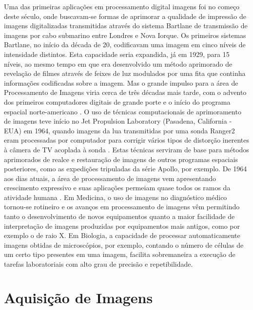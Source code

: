 \documentclass[openright]{UFRGS} %
\begin{document}
Uma das primeiras aplicações em processamento digital imagens foi no começo deste século,
onde buscavam-se formas de aprimorar a qualidade de impressão de imagens digitalizadas
transmitidas através do sistema Bartlane de transmissão de imagens por cabo submarino entre
Londres e Nova Iorque. Os primeiros sistemas Bartlane, no início da década de 20, codificavam
uma imagem em cinco níveis de intensidade distintos. Esta capacidade seria expandida, já em
1929, para 15 níveis, ao mesmo tempo em que era desenvolvido um método aprimorado de
revelação de filmes através de feixes de luz modulados por uma fita que continha informações
codificadas sobre a imagem. Mas o grande impulso para a área de Processamento de Imagens viria cerca de três
décadas mais tarde, com o advento dos primeiros computadores digitais de grande porte e o
início do programa espacial norte-americano \cite{gonzalez2010processamento}. O uso de técnicas computacionais de
aprimoramento de imagens teve início no Jet Propulsion Laboratory (Pasadena, California -
EUA) em 1964, quando imagens da lua transmitidas por uma sonda Ranger2
eram processadas por computador para corrigir vários tipos de distorção inerentes à câmera de TV acoplada à
sonda \cite{gonzalez2010processamento}. Estas técnicas serviram de base para métodos aprimorados de realce e restauração de
imagens de outros programas espaciais posteriores, como as expedições tripuladas da série
Apollo, por exemplo. De 1964 aos dias atuais, a área de processamento de imagens vem apresentando
crescimento expressivo e suas aplicações permeiam quase todos os ramos da atividade humana \cite{de2000processamento}.
Em Medicina, o uso de imagens no diagnóstico médico tornou-se rotineiro e os avanços em
processamento de imagens vêm permitindo tanto o desenvolvimento de novos equipamentos
quanto a maior facilidade de interpretação de imagens produzidas por equipamentos mais
antigos, como por exemplo o de raio X. Em Biologia, a capacidade de processar
automaticamente imagens obtidas de microscópios, por exemplo, contando o número de células
de um certo tipo presentes em uma imagem, facilita sobremaneira a execução de tarefas
laboratoriais com alto grau de precisão e repetibilidade. 



\section{Aquisição de Imagens}
\end{document}
